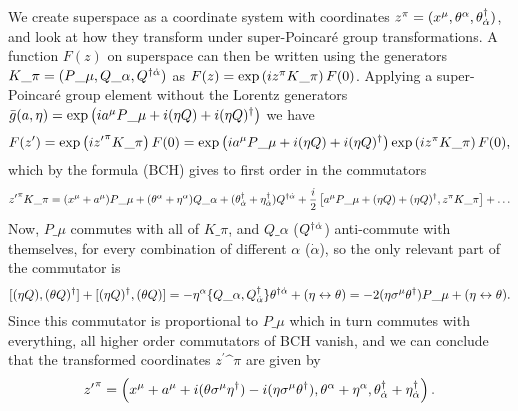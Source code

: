 \documentclass[../main.tex]{subfiles}
\begin{document}
We create superspace as a coordinate system with coordinates \(z\^{\pi} = (x\^{\mu}, \theta\^{\alpha}, \theta\indices*{^\dagger_{\dot\alpha}})\), and look at how they transform under super-Poincaré group transformations.
A function \(F(z)\) on superspace can then be written using the generators \(K\_\pi = (P\_\mu, Q\_\alpha, Q\indices*{^\dagger^{\dot\alpha}})\) as \(F(z) = \exptext{iz\^\pi K\_\pi} F(0)\).
Applying a super-Poincaré group element without the Lorentz generators \(\bar{g}(a, \eta) = \exptext{ia\^\mu P\_\mu + i (\eta Q) + i (\eta Q)^\dagger}\) we have
\begin{equation}
  F(z^\prime) = \exptext{i{z^\prime}\^\pi K\_\pi} F(0) = \exptext{ia\^\mu P\_\mu + i (\eta Q) + i (\eta Q)^\dagger} \exptext{iz\^\pi K\_\pi} F(0),
\end{equation}
which by the  formula (BCH) gives to first order in the commutators
\begin{equation}
  \label{susy:eq:supersymmetry_transformation}
  {z^\prime}\^\pi K\_\pi = (x\^\mu + a\^\mu) P\_\mu + (\theta\^\alpha + \eta\^\alpha)Q\_\alpha + (\theta\indices*{^\dagger_{\dot\alpha}} + \eta\indices*{^\dagger_{\dot\alpha}})Q\indices*{^\dagger^{\dot\alpha}} + \frac{i}{2}\bclosed{a\^\mu P\_\mu + (\eta Q) + (\eta Q)^\dagger, z\^\pi K\_\pi} + \ldots
\end{equation}
Now, \(P\_\mu\) commutes with all of \(K\_\pi\), and \(Q\_\alpha\) (\(Q\indices*{^\dagger^{\dot\alpha}}\)) anti-commute with themselves, for every combination of different \(\alpha\) (\(\dot\alpha\)), so the only relevant part of the commutator is
\begin{equation}
  \commutator{(\eta Q)}{(\theta Q)^\dagger} + \commutator{(\eta Q)^\dagger}{(\theta Q)} = -\eta\^\alpha \anticommutator{Q\_\alpha}{Q\indices*{^\dagger_{\dot\alpha}}} \theta\indices*{^\dagger^{\dot\alpha}} + (\eta \leftrightarrow \theta) = -2(\eta \sigma\^\mu \theta^\dagger)P\_\mu + (\eta \leftrightarrow \theta).
\end{equation}
Since this commutator is proportional to \(P\_\mu\) which in turn commutes with everything, all higher order commutators of BCH vanish, and we can conclude that the transformed coordinates \({z^\prime}\^\pi\) are given by
\begin{equation}
  \label{susy:eq:zprime}
  {z^\prime}\^\pi = \pclosed{x\^\mu + a\^\mu + i(\theta \sigma\^\mu \eta^\dagger) - i(\eta \sigma\^\mu \theta^\dagger), \theta\^\alpha + \eta\^\alpha, \theta\indices*{^\dagger_{\dot\alpha}} + \eta\indices*{^\dagger_{\dot\alpha}}}.
\end{equation}
\end{document}
